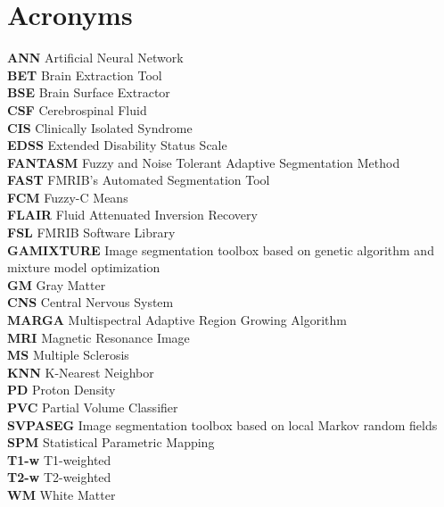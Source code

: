 
\chapter*{Acronyms}

\textbf{ANN} Artificial Neural Network\\
\textbf{BET} Brain Extraction Tool\\
\textbf{BSE} Brain Surface Extractor\\
\textbf{CSF} Cerebrospinal Fluid\\
\textbf{CIS} Clinically Isolated Syndrome\\
\textbf{EDSS} Extended Disability Status Scale\\
\textbf{FANTASM} Fuzzy and Noise Tolerant Adaptive Segmentation Method\\
\textbf{FAST} FMRIB's Automated Segmentation Tool\\
\textbf{FCM} Fuzzy-C Means \\
\textbf{FLAIR} Fluid Attenuated Inversion Recovery\\
\textbf{FSL} FMRIB Software Library\\
\textbf{GAMIXTURE} Image segmentation toolbox based on genetic algorithm and mixture model optimization\\
\textbf{GM} Gray Matter\\
\textbf{CNS} Central Nervous System\\
\textbf{MARGA} Multispectral Adaptive Region Growing Algorithm \\
\textbf{MRI} Magnetic Resonance Image\\
\textbf{MS} Multiple Sclerosis\\
\textbf{KNN} K-Nearest Neighbor \\
\textbf{PD} Proton Density\\
\textbf{PVC} Partial Volume Classifier \\
\textbf{SVPASEG} Image segmentation toolbox based on local Markov random fields\\
\textbf{SPM} Statistical Parametric Mapping\\
\textbf{T1-w} T1-weighted\\
\textbf{T2-w} T2-weighted\\
\textbf{WM} White Matter\\











